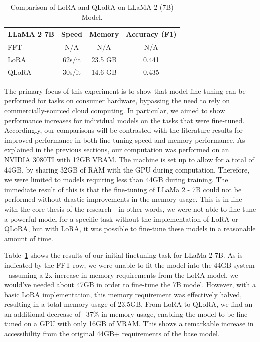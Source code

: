 \documentclass[11pt]{article}
\begin{document}
\begin{table}[h]
	\centering
	\caption{Comparison of LoRA and QLoRA on LLaMA 2 (7B) Model.}
	\label{tab:lora_qlora_comparison}
	\begin{tabular}{|l|c|c|c|}
		\hline
		\textbf{LLaMA 2 7B} & \textbf{Speed} & \textbf{Memory} & \textbf{Accuracy (F1)} \\ \hline
		FFT   & N/A      & N/A        & N/A        \\ \hline
		LoRA  & 62s/it   & 23.5 GB    & 0.441      \\ \hline
		QLoRA & 30s/it   & 14.6 GB    & 0.435      \\ \hline
	\end{tabular}
\end{table}

The primary focus of this experiment is to show that model fine-tuning can be performed for tasks on consumer hardware, bypassing the need to rely on commercially-sourced cloud computing. In particular, we aimed to show performance increases for individual models on the tasks that were fine-tuned. Accordingly, our comparisons will be contrasted with the literature results for improved performance in both fine-tuning speed and memory performance. 
As explained in the previous sections, our computation was performed on an NVIDIA 3080TI with 12GB VRAM. The machine is set up to allow for a total of 44GB, by sharing 32GB of RAM with the GPU during computation. Therefore, we were limited to models requiring less than 44GB during training. The immediate result of this is that the fine-tuning of LLaMa 2 - 7B could not be performed without drastic improvements in the memory usage. This is in line with the core thesis of the research - in other words, we were not able to fine-tune a powerful model for a specific task without the implementation of LoRA or QLoRA, but with LoRA, it was possible to fine-tune these models in a reasonable amount of time. 

Table~\ref{tab:lora_qlora_comparison} shows the results of our initial finetuning task for LLaMa 2 7B. As is indicated by the FFT row, we were unable to fit the model into the 44GB system - assuming a 2x increase in memory requirements from the LoRA model, we would’ve needed about 47GB in order to fine-tune the 7B model. However, with a basic LoRA implementation, this memory requirement was effectively halved, resulting in a total memory usage of 23.5GB. From LoRA to QLoRA, we find an an additional decrease of ~37\% in memory usage, enabling the model to be fine-tuned on a GPU with only 16GB of VRAM. This shows a remarkable increase in accessibility from the original 44GB+ requirements of the base model.
\end{document}

